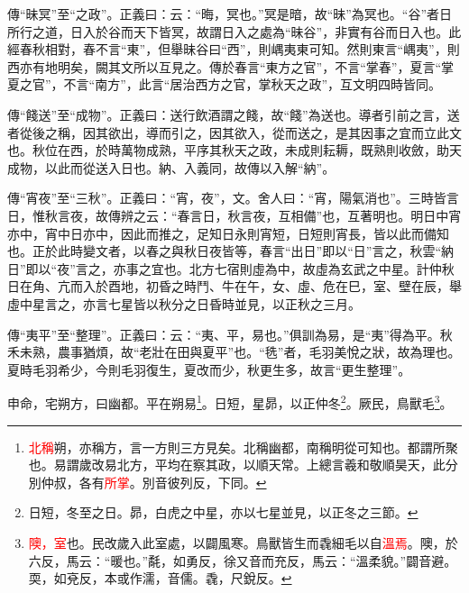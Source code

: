 {\noindent\zhuan{}\fzbyks 傳“昧冥”至“之政”。正義曰：云：“晦，冥也。”冥是暗，故“昧”為冥也。“谷”者日所行之道，日入於谷而天下皆冥，故謂日入之處為“昧谷”，非實有谷而日入也。此經春秋相對，春不言“東”，但舉昧谷曰“西”，則嵎夷東可知。然則東言“嵎夷”，則西亦有地明矣，闕其文所以互見之。傳於春言“東方之官”，不言“掌春”，夏言“掌夏之官”，不言“南方”，此言“居治西方之官，掌秋天之政”，互文明四時皆同。 \par}

{\noindent\zhuan{}\fzbyks 傳“餞送”至“成物”。正義曰：送行飲酒謂之餞，故“餞”為送也。導者引前之言，送者從後之稱，因其欲出，導而引之，因其欲入，從而送之，是其因事之宜而立此文也。秋位在西，於時萬物成熟，平序其秋天之政，未成則耘耨，既熟則收斂，助天成物，以此而從送入日也。納、入義同，故傳以入解“納”。 \par}

{\noindent\zhuan{}\fzbyks 傳“宵夜”至“三秋”。正義曰：“宵，夜”，文。舍人曰：“宵，陽氣消也”。三時皆言日，惟秋言夜，故傳辨之云：“春言日，秋言夜，互相備”也，互著明也。明日中宵亦中，宵中日亦中，因此而推之，足知日永則宵短，日短則宵長，皆以此而備知也。正於此時變文者，以春之與秋日夜皆等，春言“出日”即以“日”言之，秋雲“納日”即以“夜”言之，亦事之宜也。北方七宿則虛為中，故虛為玄武之中星。計仲秋日在角、亢而入於酉地，初昏之時鬥、牛在午，女、虛、危在巳，室、壁在辰，舉虛中星言之，亦言七星皆以秋分之日昏時並見，以正秋之三月。 \par}

{\noindent\zhuan{}\fzbyks 傳“夷平”至“整理”。正義曰：云：“夷、平，易也。”俱訓為易，是“夷”得為平。秋禾未熟，農事猶煩，故“老壯在田與夏平”也。“毨”者，毛羽美悅之狀，故為理也。夏時毛羽希少，今則毛羽復生，夏改而少，秋更生多，故言“更生整理”。 \par}

申命，宅朔方，曰幽都。平在朔易\footnote{\textcolor{red}{北稱}朔，亦稱方，言一方則三方見矣。北稱幽都，南稱明從可知也。都謂所聚也。易謂歲改易北方，平均在察其政，以順天常。上總言羲和敬順昊天，此分別仲叔，各有\textcolor{red}{所掌}。別音彼列反，下同。}。日短，星昴，以正仲冬\footnote{日短，冬至之日。昴，白虎之中星，亦以七星並見，以正冬之三節。}。厥民，鳥獸毛\footnote{\textcolor{red}{隩，室}也。民改歲入此室處，以闢風寒。鳥獸皆生而毳細毛以自\textcolor{red}{溫焉}。隩，於六反，馬云：“暖也。”氄，如勇反，徐又音而充反，馬云：“溫柔貌。”闢音避。耎，如兗反，本或作濡，音儒。毳，尺銳反。}。

